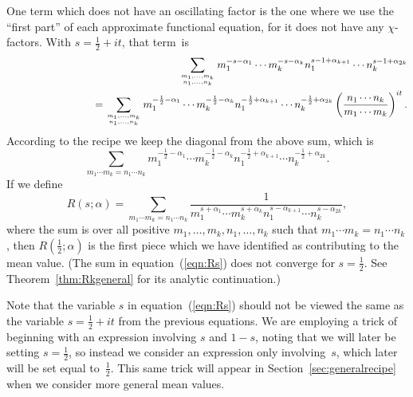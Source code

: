 \documentclass[12pt,letterpaper]{amsart}
\theoremstyle{plain}
\theoremstyle{definition}
\theoremstyle{remark}
\numberwithin{equation}{subsection}
\numberwithin{theorem}{subsection}
\numberwithin{table}{subsection}
\def\({\left(}
\def\){\right)}
\newcommand{\ontop}[2]{\genfrac{}{}{0pt}{}{#1}{#2}}
\begin{document}
One term which does not have an oscillating factor is the one where we 
use the ``first part'' of each approximate functional equation, 
for it does not have any $\chi$-factors.  With $s=\frac12+it$, 
that term~is
\begin{eqnarray} 
&& \sum _{\ontop{  m_1,\dots,m_k}{n_1,\dots,n_k }}
m_1^{-s -\alpha _1}\cdots m_k^{-s -\alpha _k}n_1^{s-1 +\alpha
_{k+1}}\cdots n_k^{s-1 +\alpha _{2k}}\cr
 && \phantom{XXXXXXXX}
=\sum _{\ontop{  m_1,\dots,m_k}{n_1,\dots,n_k }}
m_1^{-\frac12 -\alpha _1}\cdots m_k^{-\frac12 -\alpha _k}n_1^{-\frac12 +\alpha
_{k+1}}\cdots n_k^{-\frac12 +\alpha _{2k}}
\(\frac{n_1\cdots n_k }{  m_1 \cdots m_k}\)^{it}.
\end{eqnarray}
According to the recipe we keep the diagonal from the above sum, which is
\begin{equation}  
\sum_{m_1 \cdots m_k=n_1\cdots n_k}
m_1^{-\frac12 -\alpha _1}\cdots m_k^{-\frac12 -\alpha _k}n_1^{-\frac12 +\alpha
_{k+1}}\cdots n_k^{-\frac12 +\alpha _{2k}}.
\end{equation}
If we define
\begin{equation}\label{eqn:Rs}
R(s; {\alpha })=\sum_{m_1\cdots m_k =n_1 \cdots n_k  } 
\frac {1}{m_1^{s+\alpha
_1}\cdots m_k^{s+\alpha _k}n_1^{s-\alpha _{k+1}}\cdots n_k^{s-\alpha
_{2k}}},
\end{equation}
where the sum is over all positive $m_1,\dots,m_k, n_1, \dots,n_k$ such that
$m_1\cdots m_k =n_1 \cdots n_k$, 
then $R(\frac12; \alpha)$ is the first piece which we have identified as
contributing to the mean value.  (The sum in equation~(\ref{eqn:Rs})
does not converge for $s=\frac12$.  See Theorem~\ref{thm:Rkgeneral} for 
its analytic continuation.) 

Note that the variable $s$ in equation~(\ref{eqn:Rs}) should not
be viewed the same as the variable $s=\frac12+it$ from the previous
equations.
We are employing a trick of beginning with an expression involving
$s$ and $1-s$, noting that we will later be setting $s=\frac12$,
so instead we consider an expression only involving~$s$,
which later will be set equal to~$\frac12$.
This same trick will appear in Section~\ref{sec:generalrecipe}
when we consider more general mean values.
\end{document}
